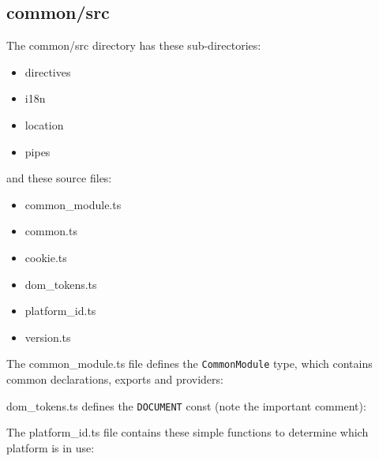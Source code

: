 \subsection{common/src}

The common/src directory has these sub-directories:

\begin{itemize}
  \item directives
  \item i18n
  \item location
  \item pipes
\end{itemize}

and these source files:

\begin{itemize}
  \item common\_module.ts
  \item common.ts
  \item cookie.ts
  \item dom\_tokens.ts
  \item platform\_id.ts
  \item version.ts
\end{itemize}

The common\_module.ts file defines the
\texttt{CommonModule}
type, which contains common
declarations, exports and providers:



dom\_tokens.ts defines the
\texttt{DOCUMENT}
const (note the important comment):



The platform\_id.ts file contains these simple functions to determine which platform is
in use:


